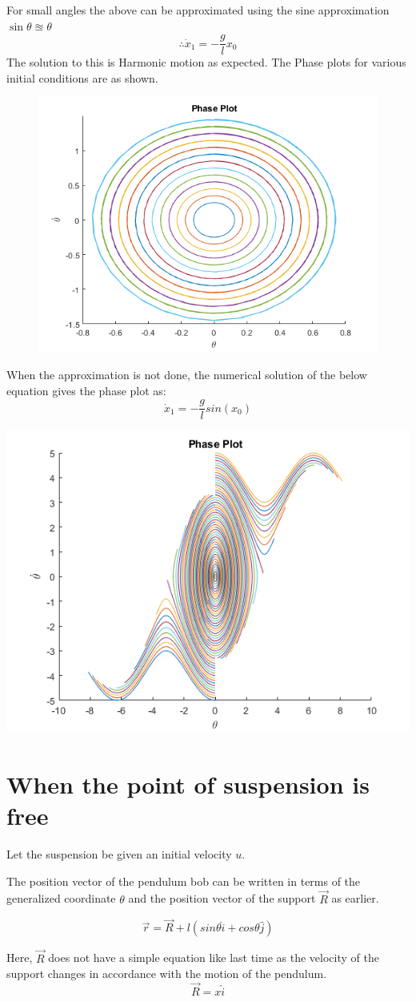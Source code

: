 \documentclass{article}
\begin{document}
	For small angles the above can be approximated using the sine approximation $ \sin \theta \approxeq \theta $
	\[ \therefore  \dot x_1 = -\frac{g}{l}x_0  \]
	The solution to this is Harmonic motion as expected.
	The Phase plots for various initial conditions are as shown.
	\begin{figure}[h!]
			\centering
		\includegraphics[width=0.5\linewidth]{Case1Plot1SmallAngles}

	\end{figure}

	
	When the approximation is not done, the numerical solution of the below equation gives the phase plot as:
	\[  \dot x_1 = -\frac{g}{l}sin(x_0) \]

		\includegraphics[width=0.5\linewidth]{Case1Plot2Directrix}



	
	\section{When the point of suspension is free}
	Let the suspension be given an initial velocity $ u $.
		
	The position vector of the pendulum bob can be written in terms of the generalized coordinate $\theta$ and the position vector of the support $ \vec{R} $ as earlier.
	
	\[ \vec{r} = \vec{R} + l(sin\theta \hat{i} + cos\theta \hat{j} )\]
	
	Here, $ \vec{R} $ does not have a simple equation like last time as the velocity of the support changes in accordance with the motion of the pendulum.
	\[ \vec{R} = x\hat{i} \]
	
\end{document}

